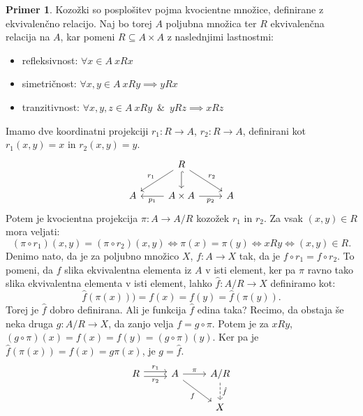 \documentclass[12pt,a4paper]{book}
\theoremstyle{definition}
\theoremstyle{plain}
\theoremstyle{definition}
\newtheorem{primer}{Primer}[section]
\theoremstyle{remark}
\begin{document}
\begin{primer} \label{konstrukcija kozozkov v Set}
Kozožki so posplošitev pojma kvocientne množice, definirane z ekvivalenčno relacijo. Naj bo torej $A$ poljubna množica ter $R$ ekvivalenčna relacija na $A$, kar pomeni $R \subseteq A \times A$ z naslednjimi lastnostmi:
\begin{itemize}
\item refleksivnost: $\forall x \in A \ xRx$
\item simetričnost: $\forall x,y \in A \ xRy \implies yRx$
\item tranzitivnost: $\forall x,y,z \in A \ xRy \enspace\&\enspace yRz \implies xRz$
\end{itemize}
Imamo dve koordinatni projekciji $r_1 : R \to A$, $r_2 : R \to A$, definirani kot $r_1(x,y) = x$ in $r_2(x,y) = y$.
%
$$\begin{tikzcd}
& R \ar[dl, "r_1"'] \ar[d, hook] \ar[dr, "r_2"] & \\
A & A \times A \ar[l, "p_1"] \ar[r, "p_2"'] & A
\end{tikzcd}$$
Potem je kvocientna projekcija $\pi : A \to A/R$ kozožek $r_1$ in $r_2$.
Za vsak $(x,y) \in R$ mora veljati:
$$(\pi \circ r_1)(x,y) = (\pi \circ r_2)(x,y) \Leftrightarrow \pi(x) = \pi(y) \Leftrightarrow xRy \Leftrightarrow (x,y) \in R.$$ 
Denimo nato, da je za poljubno množico $X$, $f: A \to X$ tak, da je $f \circ r_1 = f \circ r_2$. To pomeni, da $f$ slika ekvivalentna elementa iz $A$ v isti element, ker pa $\pi$ ravno tako slika ekvivalentna elementa v isti element, lahko $\hat{f}:A/R \to X$ definiramo kot:
$$\hat{f}(\pi(x)) ) = f(x) = f(y) = \hat{f}(\pi(y)).$$
Torej je $\hat{f}$ dobro definirana. Ali je funkcija $\hat{f}$ edina taka? Recimo, da obstaja še neka druga $g : A/R \to X$, da zanjo velja $f = g \circ \pi$. Potem je za $xRy$, $(g \circ \pi)(x) = f(x) = f(y) = (g \circ\pi)(y)$. Ker pa je $\hat{f}(\pi(x)) = f(x) = g\pi(x)$, je $g = \hat{f}$.
%
$$\begin{tikzcd}
R \ar[r, shift left, "r_1"] \ar[r, shift right, "r_2"'] & A \ar[r, "\pi"] \ar[dr, "f"'] & A/R \ar[d, dashed, "\hat{f}"] \\
& & X
\end{tikzcd}$$

\end{primer}
\end{document}
